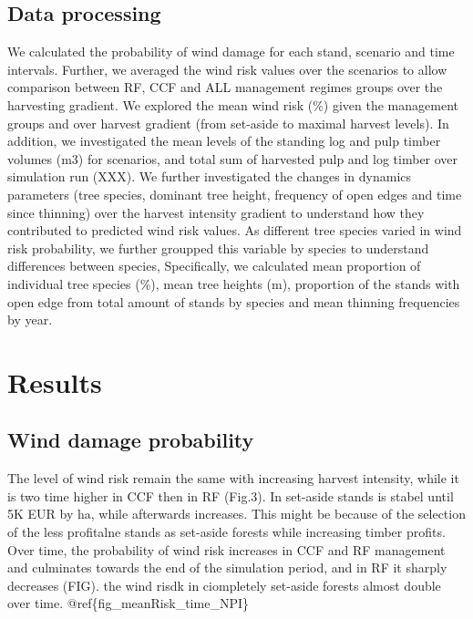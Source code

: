 \documentclass[]{elsarticle} %
\begin{document}
\subsection{Data processing}\label{data-processing}

We calculated the probability of wind damage for each stand, scenario
and time intervals. Further, we averaged the wind risk values over the
scenarios to allow comparison between RF, CCF and ALL management regimes
groups over the harvesting gradient. We explored the mean wind risk (\%)
given the management groups and over harvest gradient (from set-aside to
maximal harvest levels). In addition, we investigated the mean levels of
the standing log and pulp timber volumes (m3) for scenarios, and total
sum of harvested pulp and log timber over simulation run (XXX). We
further investigated the changes in dynamics parameters (tree species,
dominant tree height, frequency of open edges and time since thinning)
over the harvest intensity gradient to understand how they contributed
to predicted wind risk values. As different tree species varied in wind
risk probability, we further groupped this variable by species to
understand differences between species, Specifically, we calculated mean
proportion of individual tree species (\%), mean tree heights (m),
proportion of the stands with open edge from total amount of stands by
species and mean thinning frequencies by year.

\section{Results}\label{results}

\subsection{Wind damage probability}\label{wind-damage-probability}

The level of wind risk remain the same with increasing harvest
intensity, while it is two time higher in CCF then in RF (Fig.3). In
set-aside stands is stabel until 5K EUR by ha, while afterwards
increases. This might be because of the selection of the less profitalne
stands as set-aside forests while increasing timber profits. Over time,
the probability of wind risk increases in CCF and RF management and
culminates towards the end of the simulation period, and in RF it
sharply decreases (FIG). the wind risdk in ciompletely set-aside forests
almost double over time. @ref\{fig\_meanRisk\_time\_NPI\}
\end{document}
